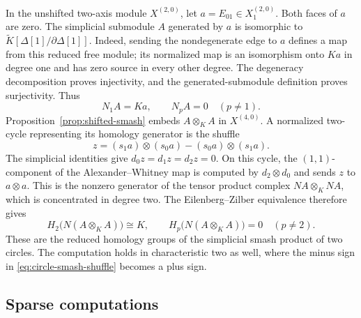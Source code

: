 \begin{example}
\label{ex:shifted-circle-smash}
In the unshifted two-axis module $X^{(2,0)}$, let
$a=E_{01}\in X^{(2,0)}_1$. Both faces of $a$ are zero. The simplicial
submodule $A$ generated by $a$ is isomorphic to
$\widetilde K[\Delta[1]/\partial\Delta[1]]$. Indeed, sending the
nondegenerate edge to $a$ defines a map from this reduced free module;
its normalized map is an isomorphism onto $Ka$ in degree one and has
zero source in every other degree. The degeneracy decomposition proves
injectivity, and the generated-submodule definition proves surjectivity.
Thus
\[
 N_1A=Ka,\qquad N_pA=0\quad(p\neq1).
\]
Proposition~\ref{prop:shifted-smash} embeds $A\otimes_K A$ in
$X^{(4,0)}$. A normalized two-cycle representing its homology generator
is the shuffle
\begin{equation}\label{eq:circle-smash-shuffle}
 z=(s_1a)\otimes(s_0a)-(s_0a)\otimes(s_1a).
\end{equation}
The simplicial identities give $d_0z=d_1z=d_2z=0$. On this cycle, the
$(1,1)$-component of the Alexander--Whitney map is computed by
$d_2\otimes d_0$ and sends $z$ to $a\otimes a$.
This is the nonzero generator of the tensor product complex
$NA\otimes_KNA$, which is concentrated in degree two. The
Eilenberg--Zilber equivalence therefore gives
\[
 H_2\bigl(N(A\otimes_K A)\bigr)\cong K,
 \qquad H_p\bigl(N(A\otimes_K A)\bigr)=0\quad(p\neq2).
\]
These are the reduced homology groups of the simplicial smash product
of two circles. The computation holds in characteristic two as well,
where the minus sign in \eqref{eq:circle-smash-shuffle} becomes a plus
sign.
\end{example}

\subsection{Sparse computations}

